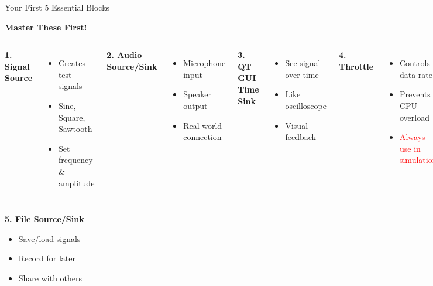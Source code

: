\documentclass[aspectratio=169,11pt]{beamer}
\begin{document}
\begin{frame}{Your First 5 Essential Blocks}
\begin{center}
\Large\textbf{Master These First!}
\end{center}
\vspace{0.5em}
\begin{columns}
\textbf{1. Signal Source}
\begin{itemize}
    \item Creates test signals
    \item Sine, Square, Sawtooth
    \item Set frequency \& amplitude
\end{itemize}
\vspace{0.5em}
\textbf{2. Audio Source/Sink}
\begin{itemize}
    \item Microphone input
    \item Speaker output
    \item Real-world connection
\end{itemize}

\textbf{3. QT GUI Time Sink}
\begin{itemize}
    \item See signal over time
    \item Like oscilloscope
    \item Visual feedback
\end{itemize}
\vspace{0.5em}
\textbf{4. Throttle}
\begin{itemize}
    \item Controls data rate
    \item Prevents CPU overload
    \item \textcolor{red}{Always use in simulation!}
\end{itemize}
\end{columns}
\vspace{0.5em}
\begin{center}
\textbf{5. File Source/Sink}
\begin{itemize}
    \item Save/load signals
    \item Record for later
    \item Share with others
\end{itemize}
\end{center}
\end{frame}
\end{document}
